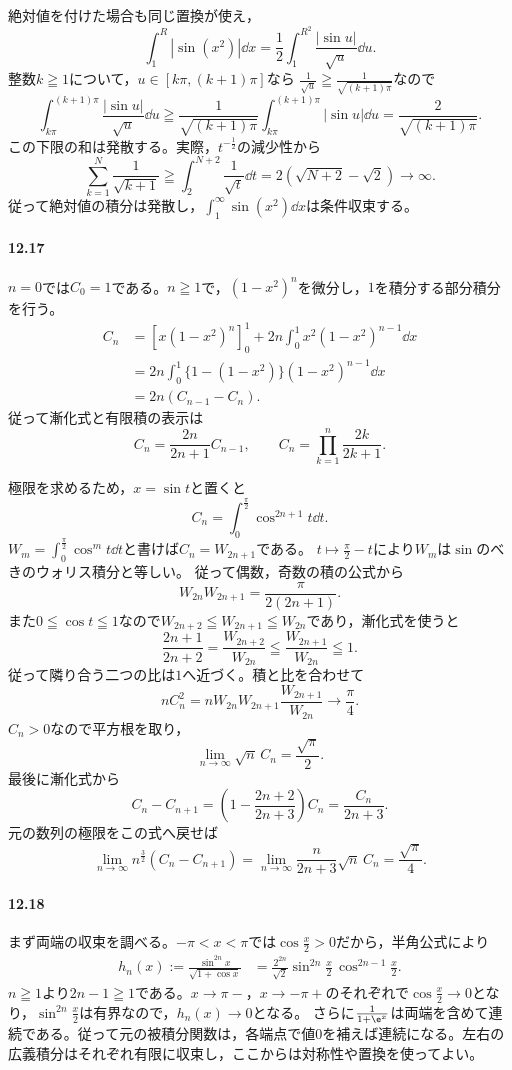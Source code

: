 絶対値を付けた場合も同じ置換が使え，
\[
 \int_1^R|\sin(x^2)|\dd x
 =\frac12\int_1^{R^2}\frac{|\sin u|}{\sqrt u}\dd u.
\]
整数$k\geqq1$について，$u\in[k\pi,(k+1)\pi]$なら
$\frac1{\sqrt u}\geqq\frac1{\sqrt{(k+1)\pi}}$なので
\[
 \int_{k\pi}^{(k+1)\pi}\frac{|\sin u|}{\sqrt u}\dd u
 \geqq\frac1{\sqrt{(k+1)\pi}}
       \int_{k\pi}^{(k+1)\pi}|\sin u|\dd u
 =\frac2{\sqrt{(k+1)\pi}}.
\]
この下限の和は発散する。実際，$t^{-\frac12}$の減少性から
\[
 \sum_{k=1}^N\frac1{\sqrt{k+1}}
 \geqq\int_2^{N+2}\frac1{\sqrt t}\dd t
 =2(\sqrt{N+2}-\sqrt2)\longrightarrow\infty.
\]
従って絶対値の積分は発散し，$\int_1^{\infty}\sin(x^2)\dd x$は条件収束する。

\paragraph{12.17}
$n=0$では$C_0=1$である。$n\geqq1$で，$(1-x^2)^n$を微分し，$1$を積分する部分積分を行う。
\[
 \begin{aligned}
 C_n
 &=\left[x(1-x^2)^n\right]_0^1
   +2n\int_0^1x^2(1-x^2)^{n-1}\dd x\\
 &=2n\int_0^1\{1-(1-x^2)\}(1-x^2)^{n-1}\dd x\\
 &=2n(C_{n-1}-C_n).
 \end{aligned}
\]
従って漸化式と有限積の表示は
\[
 \boxed{C_n=\frac{2n}{2n+1}C_{n-1},\qquad
 C_n=\prod_{k=1}^n\frac{2k}{2k+1}}.
\]

極限を求めるため，$x=\sin t$と置くと
\[
 C_n=\int_0^{\frac\pi2}\cos^{2n+1}t\dd t.
\]
$W_m=\int_0^{\frac\pi2}\cos^mt\dd t$と書けば$C_n=W_{2n+1}$である。
$t\mapsto\frac\pi2-t$により$W_m$は$\sin$のべきのウォリス積分と等しい。
従って偶数，奇数の積の公式から
\[
 W_{2n}W_{2n+1}=\frac{\pi}{2(2n+1)}.
\]
また$0\leqq\cos t\leqq1$なので$W_{2n+2}\leqq W_{2n+1}\leqq W_{2n}$であり，漸化式を使うと
\[
 \frac{2n+1}{2n+2}
 =\frac{W_{2n+2}}{W_{2n}}
 \leqq\frac{W_{2n+1}}{W_{2n}}\leqq1.
\]
従って隣り合う二つの比は$1$へ近づく。積と比を合わせて
\[
 nC_n^2
 =nW_{2n}W_{2n+1}\frac{W_{2n+1}}{W_{2n}}
 \longrightarrow\frac\pi4.
\]
$C_n>0$なので平方根を取り，
\[
 \boxed{\lim_{n\to\infty}\sqrt n\,C_n=\frac{\sqrt\pi}{2}}.
\]
最後に漸化式から
\[
 C_n-C_{n+1}
 =\left(1-\frac{2n+2}{2n+3}\right)C_n
 =\frac{C_n}{2n+3}.
\]
元の数列の極限をこの式へ戻せば
\[
 \boxed{\lim_{n\to\infty}n^{\frac32}(C_n-C_{n+1})
 =\lim_{n\to\infty}\frac{n}{2n+3}\sqrt n\,C_n
 =\frac{\sqrt\pi}{4}}.
\]

\paragraph{12.18}
まず両端の収束を調べる。$-\pi<x<\pi$では$\cos\frac x2>0$だから，半角公式により
\[
 \begin{aligned}
 h_n(x):=\frac{\sin^{2n}x}{\sqrt{1+\cos x}}
 &=\frac{2^{2n}}{\sqrt2}
   \sin^{2n}\frac x2\,\cos^{2n-1}\frac x2.
 \end{aligned}
\]
$n\geqq1$より$2n-1\geqq1$である。$x\to\pi-$，$x\to-\pi+$のそれぞれで$\cos\frac x2\to0$となり，$\sin^{2n}\frac x2$は有界なので，$h_n(x)\to0$となる。
さらに$\frac1{1+\e^x}$は両端を含めて連続である。従って元の被積分関数は，各端点で値$0$を補えば連続になる。左右の広義積分はそれぞれ有限に収束し，ここからは対称性や置換を使ってよい。

